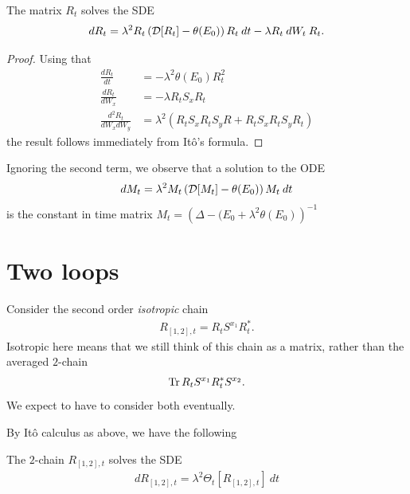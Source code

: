 \begin{proposition}
The matrix $R_{t}$ solves the SDE
\begin{align*}
dR_t = \lambda^{2} R_t \left( \mathcal{D}[R_t] - \theta(E_0)  \right)  R_t \: dt  -  \lambda R_t\: dW_t\: R_t.
\end{align*}
\end{proposition}
\begin{proof}
Using that
\begin{align*}
\frac{dR_t}{dt} &= -\lambda^{2} \theta(E_0) R^{2}_t\\
\frac{dR_t}{dW_x} &= - \lambda R_t S_x R_t\\
\frac{d^{2}R_t}{dW_xdW_y} &=  \lambda^{2}\left(  R_t S_x R_t S_y R + R_t S_x R_t S_y R_t \right)
\end{align*}
the result follows immediately from It\^{o}'s formula.
\end{proof}

Ignoring the second term, we observe that a solution to the ODE
\begin{align*}
dM_t = \lambda^{2} M_t \left( \mathcal{D}[M_t] - \theta(E_0) \right) M_t \: dt
\end{align*}
is the constant in time matrix $M_{t} = \left(\Delta - (E_0 + \lambda^{2} \theta(E_0)\right)^{-1}$

\section{Two loops}
Consider the second order \emph{isotropic} chain
\begin{align*}
R_{[1,2],t} = R_t S^{x_1} R_t^{*}.
\end{align*}
Isotropic here means that we still think of this chain as a matrix, rather than the averaged $2$-chain
\begin{align*}
\operatorname{Tr} R_t S^{x_1} R_t^{*} S^{x_2}.
\end{align*}
We expect to have to consider both eventually.

By It\^{o} calculus as above, we have the following
\begin{proposition}
The $2$-chain $R_{[1,2],t}$ solves the SDE
\begin{align*}
d R_{[1,2],t} = \lambda^{2} \Theta_t[R_{[1,2],t}] \: dt
\end{align*}
\end{proposition}


